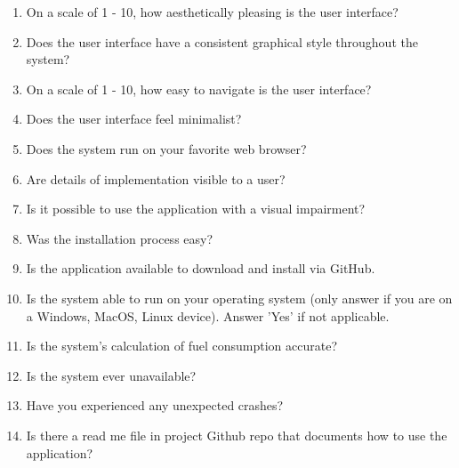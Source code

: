 \documentclass[12pt, titlepage]{article}
\begin{document}
\begin{enumerate}
  \item On a scale of 1 - 10, how aesthetically pleasing is the user interface?
  \item Does the user interface have a consistent graphical style throughout the system?
  \item On a scale of 1 - 10, how easy to navigate is the user interface?
  \item Does the user interface feel minimalist?
  \item Does the system run on your favorite web browser?
  \item Are details of implementation visible to a user?
  \item Is it possible to use the application with a visual impairment?
  \item Was the installation process easy?
  \item Is the application available to download and install via GitHub.
  \item Is the system able to run on your operating system (only answer if you are on a Windows, MacOS, Linux device). Answer 'Yes' if not applicable.
  \item Is the system's calculation of fuel consumption accurate?
  \item Is the system ever unavailable?
  \item Have you experienced any unexpected crashes?
  \item Is there a read me file in project Github repo that documents how to use the application?
\end{enumerate}



\end{document}
